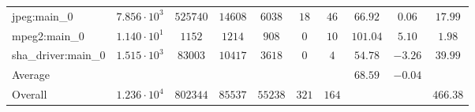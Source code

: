 \begin{tabular}{|l|c|c|c|c|c|c|c|c|c|}
jpeg:main\_0            & $ 7.856 \cdot 10^{3} $ & $ 525740 $ & $ 14608 $ & $ 6038  $ & $ 18  $ & $ 46  $ & $ 66.92       $ & $ 0.06    $ & $ 17.99   $ \\
mpeg2:main\_0           & $ 1.140 \cdot 10^{1} $ & $ 1152   $ & $ 1214  $ & $ 908   $ & $ 0   $ & $ 10  $ & $ 101.04      $ & $ 5.10    $ & $ 1.98    $ \\
sha\_driver:main\_0     & $ 1.515 \cdot 10^{3} $ & $ 83003  $ & $ 10417 $ & $ 3618  $ & $ 0   $ & $ 4   $ & $ 54.78       $ & $ -3.26   $ & $ 39.99   $ \\
\hline
Average                 & $                    $ & $        $ & $       $ & $       $ & $     $ & $     $ & $ 68.59       $ & $ -0.04   $ & $         $ \\
\hline
Overall                 & $ 1.236 \cdot 10^{4} $ & $ 802344 $ & $ 85537 $ & $ 55238 $ & $ 321 $ & $ 164 $ & $             $ & $         $ & $ 466.38  $ \\
\hline
\end{tabular}
